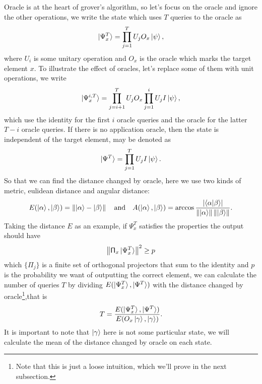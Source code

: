 \documentclass[a4paper,10pt]{article}
\numberwithin{equation}{subsection}
\begin{document}
Oracle is at the heart of grover's algorithm, so let's focus on the oracle and ignore the other operations, we write the state which uses $T$ queries to the oracle as
\begin{equation}
    \ket{\Psi_{x}^{T}}=\prod_{j=1}^{T}U_{j}O_{x}\ket{\psi},
\end{equation}
where $U_{i}$ is some unitary operation and $O_{x}$ is the oracle which marks the target element $x$. To illustrate the effect of oracles, let's replace some of them with unit operations, we write
\begin{equation}
    \ket{\Psi_{x}^{i,T}}=\prod_{j=i+1}^{T}U_{j}O_{x}\prod_{j=1}^{i}U_{j}I\ket{\psi},
\end{equation}
which use the identity for the first $i$ oracle queries and the oracle for the latter $T-i$ oracle queries. If there is no application oracle,  then the state is independent of the target element, may be denoted as
\begin{equation}
    \ket{\Psi^{T}}=\prod_{j=1}^{T}U_{j}I\ket{\psi}.
\end{equation}
So that we can find the distance changed by oracle, here we use two kinds of metric, eulidean distance and angular distance:
\begin{equation}
    E(\ket{\alpha},\ket{\beta})=\left\|\ket{\alpha}-\ket{\beta}\right\|
    \quad\text{and}\quad
    A(\ket{\alpha},\ket{\beta})=\arccos\frac{\left\lvert \braket{\alpha|\beta}\right\rvert}{\left\|\ket{\alpha}\right\|\left\|\ket{\beta}\right\|}.
\end{equation}
Taking the distance $E$ as an example, if $\Psi_{x}^{T}$ satisfies the properties the output should have
\begin{equation}\label{TheOutputWeWant}
    \left\| \mathsf{\Pi}_{x}\ket{\Psi_{x}^{T}} \right\|^{2} \geq p
\end{equation}
which $\{\mathsf{\Pi}_{j}\}$ is a finite set of orthogonal projectors that sum to the identity and $p$ is the probability we want of outputting the correct element, we can calculate the number of queries $T$ by dividing $E(\ket{\Psi_{x}^{T}},\ket{\Psi^{T}})$ with the distance changed by oracle\footnote{Note that this is just a loose intuition, which we'll prove in the next subsection.},that is
\begin{equation}
    T=\frac{E(\ket{\Psi_{x}^{T}},\ket{\Psi^{T}})}{E(O_{x}\ket{\gamma},\ket{\gamma})}.
\end{equation}
It is important to note that $\ket{\gamma}$ here is not some particular state, we will calculate the mean of the distance changed by oracle on each state.
\end{document}
